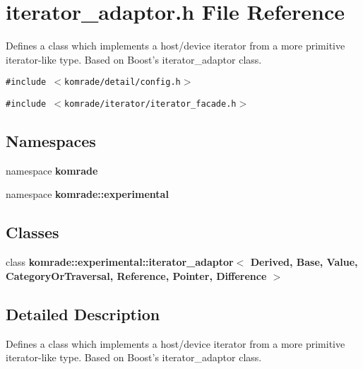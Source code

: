 \section{iterator\_\-adaptor.h File Reference}
\label{iterator__adaptor_8h}
Defines a class which implements a host/device iterator from a more primitive iterator-like type. Based on Boost's iterator\_\-adaptor class. 

{\tt \#include $<$komrade/detail/config.h$>$}\par
{\tt \#include $<$komrade/iterator/iterator\_\-facade.h$>$}\par
\subsection*{Namespaces}
\begin{CompactItemize}
\item 
namespace {\bf komrade}
\item 
namespace {\bf komrade::experimental}
\end{CompactItemize}
\subsection*{Classes}
\begin{CompactItemize}
\item 
class \textbf{komrade::experimental::iterator\_\-adaptor$<$ Derived, Base, Value, CategoryOrTraversal, Reference, Pointer, Difference $>$}
\end{CompactItemize}


\subsection{Detailed Description}
Defines a class which implements a host/device iterator from a more primitive iterator-like type. Based on Boost's iterator\_\-adaptor class. 

